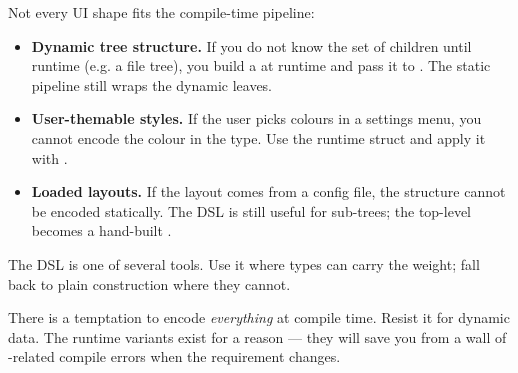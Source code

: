 Not every UI shape fits the compile-time pipeline:

\begin{itemize}[leftmargin=*]
  \item \textbf{Dynamic tree structure.} If you do not know the
    set of children until runtime (e.g. a file tree), you build
    a  at runtime and pass it to
    . The static pipeline still wraps the dynamic
    leaves.
  \item \textbf{User-themable styles.} If the user picks colours
    in a settings menu, you cannot encode the colour in the type.
    Use the runtime  struct and apply it with
    .
  \item \textbf{Loaded layouts.} If the layout comes from a
    config file, the structure cannot be encoded statically.
    The DSL is still useful for sub-trees; the top-level becomes
    a hand-built .
\end{itemize}

The DSL is one of several tools. Use it where types can carry
the weight; fall back to plain  construction where
they cannot.

\begin{warning}
There is a temptation to encode \emph{everything} at compile time.
Resist it for dynamic data. The runtime variants exist for a
reason --- they will save you from a wall of
-related compile errors when the requirement
changes.
\end{warning}
